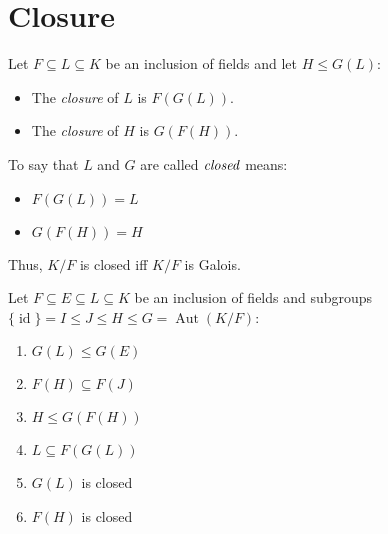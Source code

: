 \documentclass[letterpaper,12pt,fleqn]{article}
\DeclareMathOperator{\id}{id}
\DeclareMathOperator{\Aut}{Aut}
\begin{document}
\section*{Closure}

\begin{definition}[Closure]
  Let $F\subseteq L\subseteq K$ be an inclusion of fields and let $H\le G(L)$:
  \begin{itemize}
  \item The \emph{closure} of $L$ is $F(G(L))$.
  \item The \emph{closure} of $H$ is $G(F(H))$.
  \end{itemize}

  To say that $L$ and $G$ are called $\emph{closed}$ means:
  \begin{itemize}
  \item $F(G(L))=L$
  \item $G(F(H))=H$
  \end{itemize}

  Thus, $K/F$ is closed iff $K/F$ is Galois.
\end{definition}

\begin{theorem}
  Let $F\subseteq E\subseteq L\subseteq K$ be an inclusion of fields and
  subgroups $\{\id\}=I\le J\le H\le G=\Aut(K/F)$:
  \begin{enumerate}
  \item $G(L)\le G(E)$
  \item $F(H)\subseteq F(J)$
  \item $H\le G(F(H))$
  \item $L\subseteq F(G(L))$
  \item $G(L)$ is closed
  \item $F(H)$ is closed
  \end{enumerate}
\end{theorem}
\end{document}
